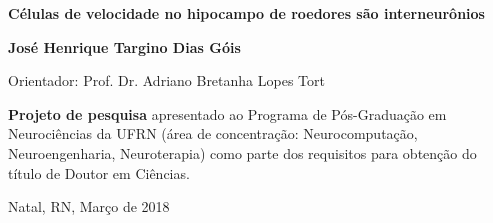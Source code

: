 \begin{titlepage}
\begin{center}
\vfill

\LARGE

\textbf{Células de velocidade no hipocampo de roedores são interneurônios}

\vfill

\Large

\textbf{José Henrique Targino Dias Góis}

\vfill

\normalsize

Orientador: Prof. Dr. Adriano Bretanha Lopes Tort

\vfill

\hfill
\parbox{0.5\linewidth}{
	\textbf{Projeto de pesquisa}
	apresentado ao Programa de Pós-Graduação em Neurociências da UFRN
	(área de concentração: Neurocomputação, Neuroengenharia, Neuroterapia)
	como parte dos requisitos para obtenção do título de
	Doutor em Ciências.
}

\vfill

\large


Natal, RN, Março de 2018

\end{center}

\end{titlepage}

